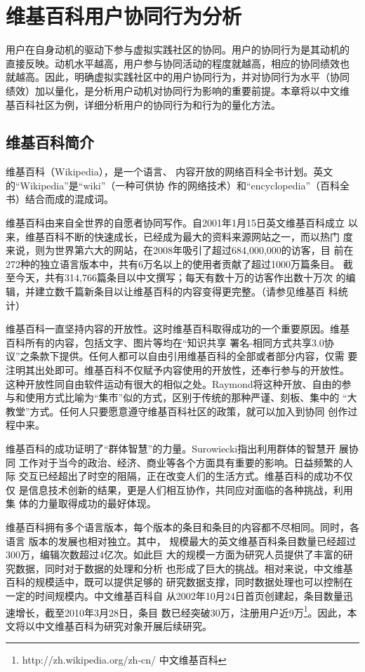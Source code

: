 
\chapter{维基百科用户协同行为分析}
\label{cha:wikipedian}

用户在自身动机的驱动下参与虚拟实践社区的协同。用户的协同行为是其动机的
直接反映。动机水平越高，用户参与协同活动的程度就越高，相应的协同绩效也
就越高。因此，明确虚拟实践社区中的用户协同行为，并对协同行为水平（协同
绩效）加以量化，是分析用户动机对协同行为影响的重要前提。本章将以中文维
基百科社区为例，详细分析用户的协同行为和行为的量化方法。
\section{维基百科简介}
维基百科（Wikipedia），是一个语言、
内容开放的网络百科全书计划。英文的“Wikipedia”是“wiki”（一种可供协
作的网络技术）和“encyclopedia”（百科全书）结合而成的混成词。

维基百科由来自全世界的自愿者协同写作。自2001年1月15日英文维基百科成立
以来，维基百科不断的快速成长，已经成为最大的资料来源网站之一，而以热门
度来说，则为世界第六大的网站，在2008年吸引了超过684,000,000的访客，目
前在272种的独立语言版本中，共有6万名以上的使用者贡献了超过1000万篇条目。
截至今天，共有314,766篇条目以中文撰写；每天有数十万的访客作出数十万次
的编辑，并建立数千篇新条目以让维基百科的内容变得更完整。（请参见维基百
科统计）

维基百科一直坚持内容的开放性。这时维基百科取得成功的一个重要原因。维基
百科所有的内容，包括文字、图片等均在“知识共享 署名-相同方式共享3.0协
议”之条款下提供。任何人都可以自由引用维基百科的全部或者部分内容，仅需
要注明其出处即可。维基百科不仅赋予内容使用的开放性，还奉行参与的开放性。
这种开放性同自由软件运动有很大的相似之处。Raymond将这种开放、自由的参
与和使用方式比喻为“集市”似的方式，区别于传统的那种严谨、刻板、集中的
“大教堂”方式。任何人只要愿意遵守维基百科社区的政策，就可以加入到协同
创作过程中来\cite{raymond1999cab}。

维基百科的成功证明了“群体智慧”的力量。Surowiecki指出利用群体的智慧开
展协同
工作对于当今的政治、经济、商业等各个方面具有重要的影响。日益频繁的人际
交互已经超出了时空的阻隔，正在改变人们的生活方式。维基百科的成功不仅仅
是信息技术创新的结果，更是人们相互协作，共同应对面临的各种挑战，利用集
体的力量取得成功的最好体现\cite{surowiecki:190}。

维基百科拥有多个语言版本，每个版本的条目和条目的内容都不尽相同。同时，各语言
版本的发展也相对独立。其中，
规模最大的英文维基百科条目数量已经超过300万，编辑次数超过4亿次。如此巨
大的规模一方面为研究人员提供了丰富的研究数据，同时对于数据的处理和分析
也形成了巨大的挑战。相对来说，中文维基百科的规模适中，既可以提供足够的
研究数据支撑，同时数据处理也可以控制在一定的时间规模内。中文维基百科自
从2002年10月24日首页创建起，条目数量迅速增长，截至2010年3月28日，条目
数已经突破30万，注册用户近9万\footnote{http://zh.wikipedia.org/zh-cn/
  中文维基百科}。因此，本文将以中文维基百科为研究对象开展后续研究。

